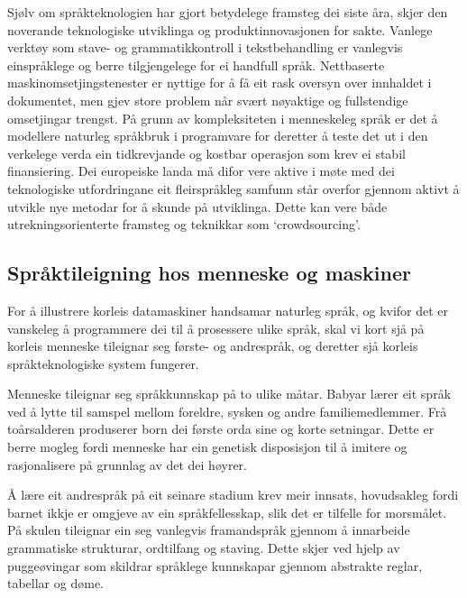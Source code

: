 \begin{multicols}{2}
Sjølv om språkteknologien har gjort betydelege framsteg dei siste åra, skjer den noverande teknologiske utviklinga og produktinnovasjonen for sakte. Vanlege verktøy som stave- og grammatikkontroll i tekstbehandling er vanlegvis einspråklege og berre tilgjengelege for ei handfull språk. Nettbaserte maskinomsetjingstenester er nyttige for å få eit rask oversyn over innhaldet i dokumentet, men gjev store problem når svært nøyaktige og fullstendige omsetjingar trengst. På grunn av kompleksiteten i menneskeleg språk er det å modellere naturleg språkbruk i programvare for deretter å teste det ut i den verkelege verda ein tidkrevjande og kostbar operasjon som krev ei stabil finansiering. Dei europeiske landa må difor vere aktive i møte med dei teknologiske utfordringane eit fleirspråkleg samfunn står overfor gjennom aktivt å utvikle nye metodar for å skunde på utviklinga. Dette kan vere både utrekningsorienterte framsteg og teknikkar som `crowdsourcing'.


\subsection{Språktileigning hos menneske og maskiner}

For å illustrere korleis datamaskiner handsamar naturleg språk, og kvifor det er vanskeleg å programmere dei til å prosessere ulike språk, skal vi kort sjå på korleis menneske tileignar seg første- og andrespråk, og deretter sjå korleis språkteknologiske system fungerer.

Menneske tileignar seg språkkunnskap på to ulike måtar. Babyar lærer eit språk ved å lytte til samspel mellom foreldre, sysken og andre familiemedlemmer. Frå toårsalderen produserer born dei første orda sine og korte setningar. Dette er berre mogleg fordi menneske har ein genetisk disposisjon til å imitere og rasjonalisere på grunnlag av det dei høyrer.

Å lære eit andrespråk på eit seinare stadium krev meir innsats, hovudsakleg fordi barnet ikkje er omgjeve av ein språkfellesskap, slik det er tilfelle for morsmålet. På skulen tileignar ein seg vanlegvis framandspråk gjennom å innarbeide grammatiske strukturar, ordtilfang og staving. Dette skjer ved hjelp av puggeøvingar som skildrar språklege kunnskapar gjennom abstrakte reglar, tabellar og døme.



\end{multicols}
